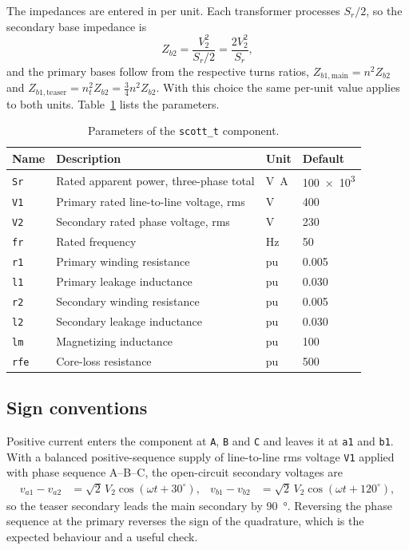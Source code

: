 The impedances are entered in per unit. Each transformer processes $S_r/2$, so
the secondary base impedance is
\begin{equation}
Z_{b2} = \frac{V_2^2}{S_r/2} = \frac{2V_2^2}{S_r} ,
\end{equation}
and the primary bases follow from the respective turns ratios,
$Z_{b1,\text{main}} = n^2 Z_{b2}$ and
$Z_{b1,\text{teaser}} = n_t^2 Z_{b2} = \tfrac{3}{4}n^2 Z_{b2}$. With this
choice the same per-unit value applies to both units. Table~\ref{scottt:tab:par}
lists the parameters.

\begin{table}[htbp]
\centering
\caption{Parameters of the \texttt{scott\_t} component.}
\label{scottt:tab:par}
\begin{tabular}{llll}
\toprule
Name & Description & Unit & Default \\
\midrule
\texttt{Sr}  & Rated apparent power, three-phase total & \si{\volt\ampere} & \num{100e3} \\
\texttt{V1}  & Primary rated line-to-line voltage, rms & \si{\volt} & 400 \\
\texttt{V2}  & Secondary rated phase voltage, rms      & \si{\volt} & 230 \\
\texttt{fr}  & Rated frequency                         & \si{\hertz} & 50 \\
\texttt{r1}  & Primary winding resistance              & pu & 0.005 \\
\texttt{l1}  & Primary leakage inductance              & pu & 0.030 \\
\texttt{r2}  & Secondary winding resistance            & pu & 0.005 \\
\texttt{l2}  & Secondary leakage inductance            & pu & 0.030 \\
\texttt{lm}  & Magnetizing inductance                  & pu & 100 \\
\texttt{rfe} & Core-loss resistance                    & pu & 500 \\
\bottomrule
\end{tabular}
\end{table}

\subsection{Sign conventions}

Positive current enters the component at \texttt{A}, \texttt{B} and \texttt{C}
and leaves it at \texttt{a1} and \texttt{b1}. With a balanced positive-sequence
supply of line-to-line rms voltage \texttt{V1} applied with phase sequence
A--B--C, the open-circuit secondary voltages are
\begin{align}
v_{a1}-v_{a2} &= \sqrt{2}\,V_2\cos(\omega t + 30^\circ), &
v_{b1}-v_{b2} &= \sqrt{2}\,V_2\cos(\omega t + 120^\circ),
\end{align}
so the teaser secondary leads the main secondary by \SI{90}{\degree}. Reversing
the phase sequence at the primary reverses the sign of the quadrature, which is
the expected behaviour and a useful check.

